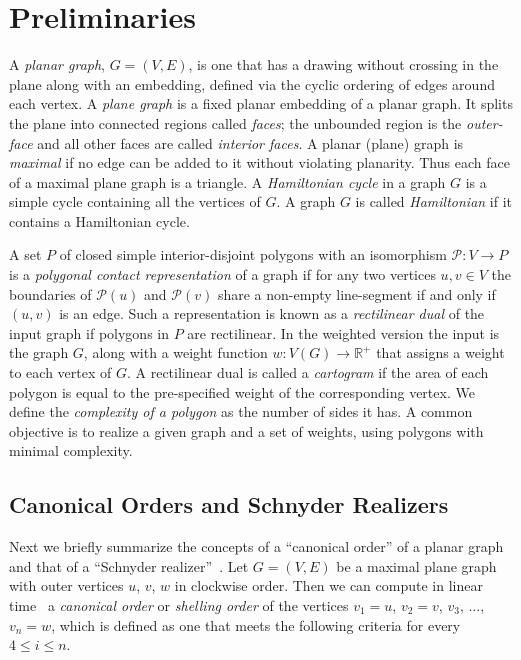 \documentclass[11pt]{article}
\begin{document}
\section{Preliminaries}
\label{sec:prelim}

A {\em planar graph}, $G=(V,E)$, is one that has a drawing without
crossing in the plane along with an embedding, defined via the cyclic ordering
of edges around each vertex. A {\em plane graph} is a fixed planar embedding of a planar graph.
It splits the plane into connected regions called {\em faces}; the unbounded region
is the {\em outer-face} and all other faces are called {\em interior faces}. A
planar (plane) graph is \textit{maximal} if no edge can be added to it without violating planarity.
Thus each face of a maximal plane graph is a triangle. A \textit{Hamiltonian cycle}
in a graph $G$ is a simple cycle containing all the vertices of $G$. A graph $G$ is
called \textit{Hamiltonian} if it contains a Hamiltonian cycle.

A set $P$ of closed simple
 interior-disjoint polygons with an isomorphism
 $\mathcal{P}:V\rightarrow P$ is a {\em polygonal contact
representation} of a graph
if for any two vertices
 $u, v \in V$ the boundaries of $\mathcal{P}(u)$ and $\mathcal{P}(v)$ share a non-empty
 line-segment if and only if $(u,v)$ is an edge.
Such a representation is known
 as a {\em rectilinear dual} of the input graph if polygons in $P$ are
 rectilinear.
 In the weighted version the input is the graph $G$, along with a weight function $w:V(G)\rightarrow \mathbb{R}^+$ that
 assigns a weight to each vertex of $G$. A rectilinear dual is called a \textit{cartogram} if the area
 of each polygon is equal to the pre-specified weight of the corresponding vertex.
 We define the \textit{complexity of a polygon} as the number of sides it has.
A common objective is to realize a given graph and a set of weights,
using polygons with minimal complexity.

\subsection{Canonical Orders and Schnyder Realizers}

Next we briefly summarize the concepts of a ``canonical order'' of a
planar graph~\cite{fpp-hdpgg-90} and that of a  ``Schnyder  realizer''~\cite{s-epgg-90}.
Let $G=(V, E)$ be a maximal plane graph with outer vertices $u$, $v$, $w$ in clockwise order. Then
 we can compute in linear time~\cite{cp-ltadp-95} a \textit{canonical order} or \textit{shelling order} of
 the vertices $v_1 = u$, $v_2 = v$, $v_3$, $\ldots$, $v_n = w$, which is defined as one that meets the
 following criteria for every $4\le i\le n$.
\end{document}
